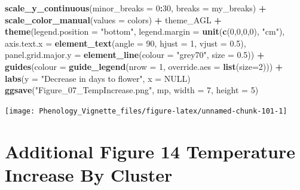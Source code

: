\documentclass[
]{article}
\newenvironment{Shaded}{\begin{snugshade}}{\end{snugshade}}
\newcommand{\DataTypeTok}[1]{\textcolor[rgb]{0.13,0.29,0.53}{#1}}
\newcommand{\DecValTok}[1]{\textcolor[rgb]{0.00,0.00,0.81}{#1}}
\newcommand{\FloatTok}[1]{\textcolor[rgb]{0.00,0.00,0.81}{#1}}
\newcommand{\KeywordTok}[1]{\textcolor[rgb]{0.13,0.29,0.53}{\textbf{#1}}}
\newcommand{\NormalTok}[1]{#1}
\newcommand{\OperatorTok}[1]{\textcolor[rgb]{0.81,0.36,0.00}{\textbf{#1}}}
\newcommand{\OtherTok}[1]{\textcolor[rgb]{0.56,0.35,0.01}{#1}}
\newcommand{\StringTok}[1]{\textcolor[rgb]{0.31,0.60,0.02}{#1}}
\begin{document}
\begin{Shaded}
\begin{Highlighting}[]
\StringTok{  }\KeywordTok{scale_y_continuous}\NormalTok{(}\DataTypeTok{minor_breaks =} \DecValTok{0}\OperatorTok{:}\DecValTok{30}\NormalTok{, }\DataTypeTok{breaks =}\NormalTok{ my_breaks) }\OperatorTok{+}
\StringTok{  }\KeywordTok{scale_color_manual}\NormalTok{(}\DataTypeTok{values =}\NormalTok{ colors) }\OperatorTok{+}
\StringTok{  }\NormalTok{theme_AGL }\OperatorTok{+}\StringTok{ }
\StringTok{  }\KeywordTok{theme}\NormalTok{(}\DataTypeTok{legend.position =} \StringTok{"bottom"}\NormalTok{, }\DataTypeTok{legend.margin =} \KeywordTok{unit}\NormalTok{(}\KeywordTok{c}\NormalTok{(}\DecValTok{0}\NormalTok{,}\DecValTok{0}\NormalTok{,}\DecValTok{0}\NormalTok{,}\DecValTok{0}\NormalTok{), }\StringTok{"cm"}\NormalTok{),}
        \DataTypeTok{axis.text.x =} \KeywordTok{element_text}\NormalTok{(}\DataTypeTok{angle =} \DecValTok{90}\NormalTok{, }\DataTypeTok{hjust =} \DecValTok{1}\NormalTok{, }\DataTypeTok{vjust =} \FloatTok{0.5}\NormalTok{),}
        \DataTypeTok{panel.grid.major.y =} \KeywordTok{element_line}\NormalTok{(}\DataTypeTok{colour =} \StringTok{"grey70"}\NormalTok{, }\DataTypeTok{size =} \FloatTok{0.5}\NormalTok{)) }\OperatorTok{+}
\StringTok{  }\KeywordTok{guides}\NormalTok{(}\DataTypeTok{colour =} \KeywordTok{guide_legend}\NormalTok{(}\DataTypeTok{nrow =} \DecValTok{1}\NormalTok{, }\DataTypeTok{override.aes =} \KeywordTok{list}\NormalTok{(}\DataTypeTok{size=}\DecValTok{2}\NormalTok{))) }\OperatorTok{+}
\StringTok{  }\KeywordTok{labs}\NormalTok{(}\DataTypeTok{y =} \StringTok{"Decrease in days to flower"}\NormalTok{, }\DataTypeTok{x =} \OtherTok{NULL}\NormalTok{)}
\KeywordTok{ggsave}\NormalTok{(}\StringTok{"Figure_07_TempIncrease.png"}\NormalTok{, mp, }\DataTypeTok{width =} \DecValTok{7}\NormalTok{, }\DataTypeTok{height =} \DecValTok{5}\NormalTok{)}
\end{Highlighting}
\end{Shaded}

\texttt{[image: Phenology\_Vignette\_files/figure-latex/unnamed-chunk-101-1]}

\hypertarget{additional-figure-14-temperature-increase-by-cluster}{%
\section{Additional Figure 14 Temperature Increase By
Cluster}\label{additional-figure-14-temperature-increase-by-cluster}}
\end{document}
